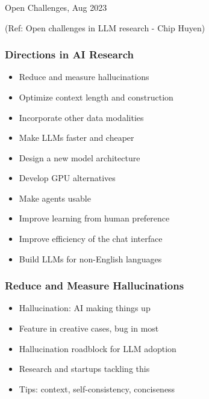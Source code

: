 \begin{frame}[fragile]\frametitle{}
\begin{center}
{\Large Open Challenges, Aug 2023}

{\tiny (Ref: Open challenges in LLM research - Chip Huyen)}

\end{center}
\end{frame}

\begin{frame}[fragile]
  \frametitle{Directions in AI Research}
  \begin{itemize}
    \item Reduce and measure hallucinations
    \item Optimize context length and construction
    \item Incorporate other data modalities
    \item Make LLMs faster and cheaper
    \item Design a new model architecture
    \item Develop GPU alternatives
    \item Make agents usable
    \item Improve learning from human preference
    \item Improve efficiency of the chat interface
    \item Build LLMs for non-English languages
  \end{itemize}
\end{frame}

\begin{frame}[fragile]
  \frametitle{Reduce and Measure Hallucinations}
  \begin{itemize}
    \item Hallucination: AI making things up
    \item Feature in creative cases, bug in most
    \item Hallucination roadblock for LLM adoption
    \item Research and startups tackling this
    \item Tips: context, self-consistency, conciseness
  \end{itemize}
\end{frame}

